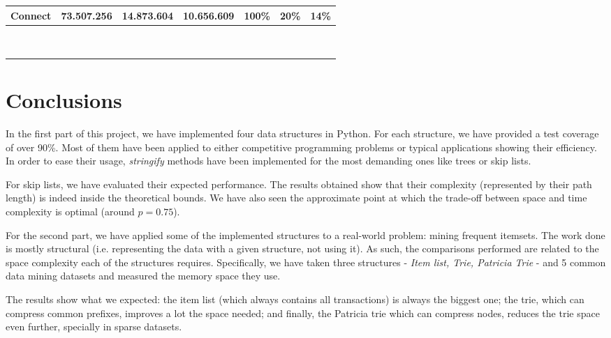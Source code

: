 \documentclass[a4paper,10pt,table,xcdraw]{article}
\begin{document}
\begin{table}[h]
\begin{tabular}{lllllll}
\multicolumn{1}{|l|}{\cellcolor[HTML]{DAE8FC}Connect} & \multicolumn{1}{c|}{73.507.256} & \multicolumn{1}{c|}{14.873.604} & \multicolumn{1}{c|}{10.656.609} & \multicolumn{1}{c|}{100\%} & \multicolumn{1}{c|}{20\%} & \multicolumn{1}{c|}{14\%} \\ \hline
 &  &  &  &  &  &  \\
 &  &  &  &  &  &  \\
 &  &  &  &  &  &  \\
 &  &  &  &  &  &  \\
 &  &  &  &  &  &  \\
 &  &  &  &  &  &  \\
 &  &  &  &  &  &  \\
 &  &  &  &  &  &  \\
 &  &  &  &  &  & 
\end{tabular}
\end{table}




\section{Conclusions}
\label{sec:conclusions}

In the first part of this project, we have implemented four data structures in Python. For each structure, we have provided a test coverage of over 90\%. Most of them have been applied to either competitive programming problems or typical applications showing their efficiency. In order to ease their usage, \textit{stringify} methods have been implemented for the most demanding ones like trees or skip lists. 

For skip lists, we have evaluated their expected performance. The results obtained show that their complexity (represented by their path length) is indeed inside the theoretical bounds. We have also seen the approximate point at which the trade-off between space and time complexity is optimal (around $p=0.75$).

For the second part, we have applied some of the implemented structures to a real-world problem: mining frequent itemsets. The work done is mostly structural (i.e. representing the data with a given structure, not using it). As such, the comparisons performed are related to the space complexity each of the structures requires. Specifically, we have taken three structures - \textit{Item list, Trie, Patricia Trie} - and 5 common data mining datasets and measured the memory space they use.

The results show what we expected: the item list (which always contains all transactions) is always the biggest one; the trie, which can compress common prefixes, improves a lot the space needed; and finally, the Patricia trie which can compress nodes, reduces the trie space even further, specially in sparse datasets.
\end{document}
